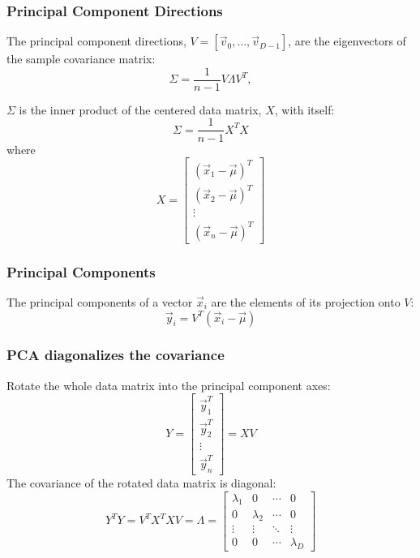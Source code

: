 \documentclass{beamer}
\begin{document}
\begin{frame}
  \frametitle{Principal Component Directions}

  The principal component directions, $V=[\vec{v}_0,\ldots,\vec{v}_{D-1}]$,
  are the eigenvectors of the sample covariance matrix:
  \begin{displaymath}
    \Sigma =\frac{1}{n-1}V\Lambda V^T,
  \end{displaymath}

  $\Sigma$ is the inner product of the centered data matrix, $X$, with itself:
  \begin{displaymath}
    \Sigma = \frac{1}{n-1} X^T X
  \end{displaymath}
  where
  \begin{displaymath}
    X= \left[\begin{array}{c}
        (\vec{x}_1-\vec\mu)^T\\(\vec{x}_2-\vec\mu)^T\\\vdots\\(\vec{x}_n-\vec\mu)^T
      \end{array}\right]
  \end{displaymath}
\end{frame}

\begin{frame}
  \frametitle{Principal Components}

  The principal components of a vector $\vec{x}_i$ are the elements of
  its projection onto $V$:
  \begin{displaymath}
  \vec{y}_i = V^T(\vec{x}_i-\vec\mu)
  \end{displaymath}
\end{frame}

\begin{frame}
  \frametitle{PCA diagonalizes the covariance}

  Rotate the whole data matrix into the principal component axes:
  \begin{displaymath}
    Y = \left[\begin{array}{c}\vec{y}_1^T\\\vec{y}_2^T\\\vdots\\\vec{y}_n^T\end{array}\right]
    = XV
  \end{displaymath}
  The covariance of the rotated data matrix is diagonal:
  \begin{displaymath}
    Y^TY = V^TX^TXV = \Lambda
    =\left[
      \begin{array}{cccc}
        \lambda_1 & 0 & \cdots & 0\\
        0 & \lambda_2 & \cdots &  0\\
        \vdots & \vdots & \ddots & \vdots \\
        0 & 0 & \cdots & \lambda_D
      \end{array}
      \right]
  \end{displaymath}
\end{frame}
\end{document}
